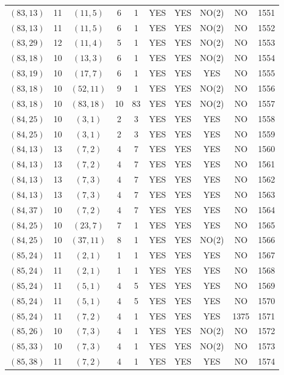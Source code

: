 \begin{longtable}{|c|c|c|c|c|c|c|c|c|c|}
$(83, 13)$ & 11 & $(11, 5)$ & 6 & 1 & YES & YES & NO(2) & NO & 1551\\
$(83, 13)$ & 11 & $(11, 5)$ & 6 & 1 & YES & YES & NO(2) & NO & 1552\\
$(83, 29)$ & 12 & $(11, 4)$ & 5 & 1 & YES & YES & NO(2) & NO & 1553\\
$(83, 18)$ & 10 & $(13, 3)$ & 6 & 1 & YES & YES & NO(2) & NO & 1554\\
$(83, 19)$ & 10 & $(17, 7)$ & 6 & 1 & YES & YES & YES & NO & 1555\\
$(83, 18)$ & 10 & $(52, 11)$ & 9 & 1 & YES & YES & NO(2) & NO & 1556\\
$(83, 18)$ & 10 & $(83, 18)$ & 10 & 83 & YES & YES & NO(2) & NO & 1557\\
$(84, 25)$ & 10 & $(3, 1)$ & 2 & 3 & YES & YES & YES & NO & 1558\\
$(84, 25)$ & 10 & $(3, 1)$ & 2 & 3 & YES & YES & YES & NO & 1559\\
$(84, 13)$ & 13 & $(7, 2)$ & 4 & 7 & YES & YES & YES & NO & 1560\\
$(84, 13)$ & 13 & $(7, 2)$ & 4 & 7 & YES & YES & YES & NO & 1561\\
$(84, 13)$ & 13 & $(7, 3)$ & 4 & 7 & YES & YES & YES & NO & 1562\\
$(84, 13)$ & 13 & $(7, 3)$ & 4 & 7 & YES & YES & YES & NO & 1563\\
$(84, 37)$ & 10 & $(7, 2)$ & 4 & 7 & YES & YES & YES & NO & 1564\\
$(84, 25)$ & 10 & $(23, 7)$ & 7 & 1 & YES & YES & YES & NO & 1565\\
$(84, 25)$ & 10 & $(37, 11)$ & 8 & 1 & YES & YES & NO(2) & NO & 1566\\
$(85, 24)$ & 11 & $(2, 1)$ & 1 & 1 & YES & YES & YES & NO & 1567\\
$(85, 24)$ & 11 & $(2, 1)$ & 1 & 1 & YES & YES & YES & NO & 1568\\
$(85, 24)$ & 11 & $(5, 1)$ & 4 & 5 & YES & YES & YES & NO & 1569\\
$(85, 24)$ & 11 & $(5, 1)$ & 4 & 5 & YES & YES & YES & NO & 1570\\
$(85, 24)$ & 11 & $(7, 2)$ & 4 & 1 & YES & YES & YES & 1375 & 1571\\
$(85, 26)$ & 10 & $(7, 3)$ & 4 & 1 & YES & YES & NO(2) & NO & 1572\\
$(85, 33)$ & 10 & $(7, 3)$ & 4 & 1 & YES & YES & NO(2) & NO & 1573\\
$(85, 38)$ & 11 & $(7, 2)$ & 4 & 1 & YES & YES & YES & NO & 1574\\

\end{longtable}
